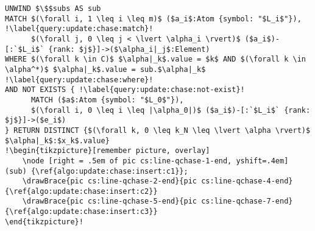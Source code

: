 \begin{lstlisting}[mathescape, name=qchase, language=cypher, caption=Format des requêtes $Q_{chase}$, label={algo:update:chase:query}, escapechar=!, float, floatplacement=htb]
UNWIND $\$$subs AS sub
MATCH $(\forall i, 1 \leq i \leq m)$ ($a_i$:Atom {symbol: "$L_i$"}), !\label{query:update:chase:match}!
      $(\forall j, 0 \leq j < \lvert \alpha_i \rvert)$ ($a_i$)-[:`$L_i$` {rank: $j$}]->($\alpha_i|_j$:Element)
WHERE $(\forall k \in C)$ $\alpha|_k$.value = $k$ AND $(\forall k \in \alpha^*)$ $\alpha|_k$.value = sub.$\alpha|_k$ !\label{query:update:chase:where}!
AND NOT EXISTS { !\label{query:update:chase:not-exist}!
      MATCH ($a$:Atom {symbol: "$L_0$"}),
      $(\forall i, 0 \leq i \leq |\alpha_0|)$ ($a_i$)-[:`$L_i$` {rank: $j$}]->($e_i$)
} RETURN DISTINCT {$(\forall k, 0 \leq k_N \leq \lvert \alpha \rvert)$ $\alpha|_k$:$x_k$.value}
!\begin{tikzpicture}[remember picture, overlay]
    \node [right = .5em of pic cs:line-qchase-1-end, yshift=.4em] (sub) {\ref{algo:update:chase:insert:c1}};
    \drawBrace{pic cs:line-qchase-2-end}{pic cs:line-qchase-4-end}{\ref{algo:update:chase:insert:c2}}
    \drawBrace{pic cs:line-qchase-5-end}{pic cs:line-qchase-7-end}{\ref{algo:update:chase:insert:c3}}
\end{tikzpicture}!
\end{lstlisting}

\FloatBarrier

